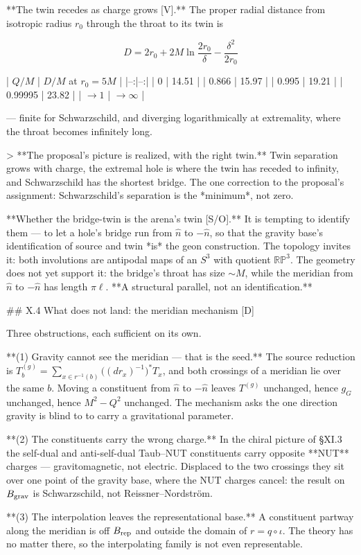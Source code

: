 **The twin recedes as charge grows [V].** The proper radial distance from isotropic radius $r_0$ through the throat to its twin is

$$D = 2r_0+2M\ln\frac{2r_0}{\delta}-\frac{\delta^2}{2r_0}$$

| $Q/M$ | $D/M$ at $r_0 = 5M$ |
|--:|--:|
| 0 | 14.51 |
| 0.866 | 15.97 |
| 0.995 | 19.21 |
| 0.99995 | 23.82 |
| $\to1$ | $\to\infty$ |

— finite for Schwarzschild, and diverging logarithmically at extremality, where the throat becomes infinitely long.

> **The proposal's picture is realized, with the right twin.** Twin separation grows with charge, the extremal hole is where the twin has receded to infinity, and Schwarzschild has the shortest bridge. The one correction to the proposal's assignment: Schwarzschild's separation is the *minimum*, not zero.

**Whether the bridge-twin is the arena's twin [S/O].** It is tempting to identify them — to let a hole's bridge run from $\hat n$ to $-\hat n$, so that the gravity base's identification of source and twin *is* the geon construction. The topology invites it: both involutions are antipodal maps of an $S^3$ with quotient $\mathbb{RP}^3$. The geometry does not yet support it: the bridge's throat has size $\sim M$, while the meridian from $\hat n$ to $-\hat n$ has length $\pi\ell$. **A structural parallel, not an identification.**

## X.4 What does not land: the meridian mechanism [D]

Three obstructions, each sufficient on its own.

**(1) Gravity cannot see the meridian — that is the seed.** The source reduction is $T^{(g)}_b = \sum_{x\in r^{-1}(b)}\big((dr_x)^{-1}\big)^*T_x$, and both crossings of a meridian lie over the same $b$. Moving a constituent from $\hat n$ to $-\hat n$ leaves $T^{(g)}$ unchanged, hence $g_G$ unchanged, hence $M^2-Q^2$ unchanged. The mechanism asks the one direction gravity is blind to to carry a gravitational parameter.

**(2) The constituents carry the wrong charge.** In the chiral picture of §XI.3 the self-dual and anti-self-dual Taub–NUT constituents carry opposite **NUT** charges — gravitomagnetic, not electric. Displaced to the two crossings they sit over one point of the gravity base, where the NUT charges cancel: the result on $B_{\rm grav}$ is Schwarzschild, not Reissner–Nordström.

**(3) The interpolation leaves the representational base.** A constituent partway along the meridian is off $B_{\rm rep}$ and outside the domain of $r = q\circ\iota$. The theory has no matter there, so the interpolating family is not even representable.

